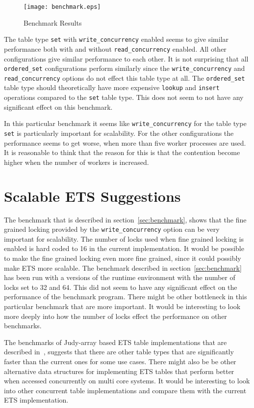 \documentclass[aps,pre,preprint,nofootinbib]{revtex4}
\begin{document}
  
\begin{figure}[htb]
\centering
\texttt{[image: benchmark.eps]}
\caption{Benchmark Results} 
\label{fig:benchmark_results}
\end{figure}

  The table type \verb|set| with \verb|write_concurrency| enabled seems to give similar performance both with and without \verb|read_concurrency| enabled.
  All other configurations give similar performance to each other.
  It is not surprising that all \verb|ordered_set| configurations perform similarly since the \verb|write_concurrency| and \verb|read_concurrency| options do not effect this table type at all.
  The \verb|ordered_set| table type should theoretically have more expensive \verb|lookup| and \verb|insert| operations compared to the \verb|set| table type.
  This does not seem to not have any significant effect on this benchmark.
  
  In this particular benchmark it seems like \verb|write_concurrency| for the table type \verb|set| is particularly important for scalability.
  For the other configurations the performance seems to get worse, when more than five worker processes are used.
  It is reasonable to think that the reason for this is that the contention become higher when the number of workers is increased.

  
  
\section{Scalable ETS Suggestions}

  The benchmark that is described in section~\ref{sec:benchmark}, shows that the fine grained locking provided by the \verb|write_concurrency| option can be very important for scalability.
  The number of locks used when fine grained locking is enabled is hard coded to 16 in the current implementation.
  It would be possible to make the fine grained locking even more fine grained, since it could possibly make ETS more scalable.
  The benchmark described in section~\ref{sec:benchmark} has been run with a versions of the runtime environment with the number of locks set to 32 and 64.
  This did not seem to have any significant effect on the performance of the benchmark program.
  There might be other bottleneck in this particular benchmark that are more important.
  It would be interesting to look more deeply into how the number of locks effect the performance on other benchmarks.
  
  The benchmarks of Judy-array based ETS table implementations that are described in~\cite{ScottEtsJudy}, suggests that there are other table types that are significantly faster than the current ones for some use cases.
  There might also be be other alternative data structures for implementing ETS tables that perform better when accessed concurrently on multi core systems.
  It would be interesting to look into other concurrent table implementations and compare them with the current ETS implementation.
  
\end{document}
